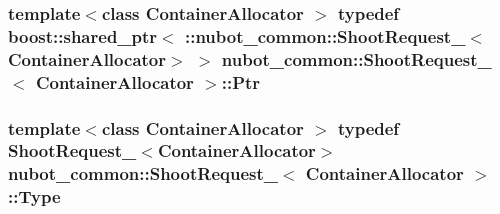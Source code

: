 \hypertarget{structnubot__common_1_1ShootRequest___a1a4dc93f8b0e5bf5048e6f6b79dd495f}{
\subsubsection[{Ptr}]{\setlength{\rightskip}{0pt plus 5cm}template$<$class Container\-Allocator $>$ typedef boost\-::shared\-\_\-ptr$<$ \-::{\bf nubot\-\_\-common\-::\-Shoot\-Request\-\_\-}$<$Container\-Allocator$>$ $>$ {\bf nubot\-\_\-common\-::\-Shoot\-Request\-\_\-}$<$ Container\-Allocator $>$\-::{\bf Ptr}}}\label{structnubot__common_1_1ShootRequest___a1a4dc93f8b0e5bf5048e6f6b79dd495f}
\hypertarget{structnubot__common_1_1ShootRequest___aaf26ccf95c5cb56763cb643600f92005}{
\subsubsection[{Type}]{\setlength{\rightskip}{0pt plus 5cm}template$<$class Container\-Allocator $>$ typedef {\bf Shoot\-Request\-\_\-}$<$Container\-Allocator$>$ {\bf nubot\-\_\-common\-::\-Shoot\-Request\-\_\-}$<$ Container\-Allocator $>$\-::{\bf Type}}}\label{structnubot__common_1_1ShootRequest___aaf26ccf95c5cb56763cb643600f92005}


